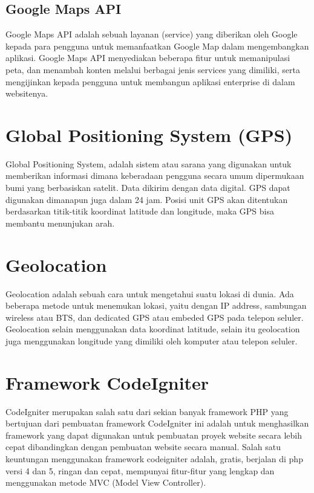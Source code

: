 \subsection {Google Maps API }
Google Maps API adalah sebuah layanan (service) yang diberikan oleh Google
kepada para pengguna untuk memanfaatkan Google Map dalam mengembangkan
aplikasi. Google Maps API menyediakan beberapa fitur untuk memanipulasi peta, dan
menambah konten melalui berbagai jenis services yang dimiliki, serta mengijinkan
kepada pengguna untuk membangun aplikasi enterprise di dalam websitenya.


\section{Global Positioning System (GPS)}
Global Positioning System, adalah sistem atau sarana yang digunakan untuk memberikan informasi dimana keberadaan pengguna secara umum dipermukaan bumi yang berbasiskan satelit. Data dikirim dengan data digital. GPS dapat digunakan dimanapun juga dalam 24 jam. Posisi unit GPS akan ditentukan berdasarkan titik-titik koordinat latitude dan longitude, maka GPS bisa membantu menunjukan arah. 


\section{Geolocation}
Geolocation adalah sebuah cara untuk mengetahui suatu lokasi di dunia. Ada beberapa metode untuk menemukan lokasi, yaitu dengan IP address, sambungan wireless atau BTS, dan dedicated GPS atau embeded GPS pada telepon seluler. Geolocation selain menggunakan data koordinat latitude, selain itu geolocation juga menggunakan longitude yang dimiliki oleh komputer atau telepon seluler.


\section{Framework CodeIgniter}
CodeIgniter merupakan salah satu dari sekian banyak framework PHP yang  bertujuan dari pembuatan framework CodeIgniter ini adalah untuk menghasilkan framework  yang dapat digunakan untuk pembuatan proyek website secara lebih cepat dibandingkan dengan pembuatan website secara manual.
Salah satu keuntungan menggunakan framework codeigniter adalah, gratis, berjalan di php versi 4 dan 5, ringan dan cepat, mempunyai fitur-fitur yang lengkap dan menggunakan metode MVC (Model View Controller).



